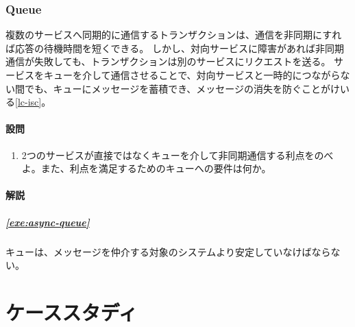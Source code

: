 \documentclass{jlreq}
\begin{document}
\section{Queue}
\begin{refsection}
  複数のサービスへ同期的に通信するトランザクションは、通信を非同期にすれば応答の待機時間を短くできる。
  しかし、対向サービスに障害があれば非同期通信が失敗しても、トランザクションは別のサービスにリクエストを送る。
  サービスをキューを介して通信させることで、対向サービスと一時的につながらない間でも、キューにメッセージを蓄積でき、メッセージの消失を防ぐことがけいる\ref{lc-isc}。
  \subsection{設問}
  \begin{enumerate}[label=問題\arabic*,labelsep=10pt,leftmargin=*]
  \item 2つのサービスが直接ではなくキューを介して非同期通信する利点をのべよ。また、利点を満足するためのキューへの要件は何か。\label{exe:async-queue}
  \end{enumerate}
  \subsection{解説}
  \subsubsection*{\ref{exe:async-queue}}
  キューは、メッセージを仲介する対象のシステムより安定していなけばならない。
  \printjbibliography
  
\end{refsection}
\part{ケーススタディ}
\end{document}
